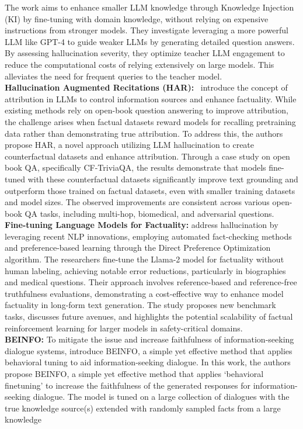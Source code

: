 \documentclass[11pt]{article}
\begin{document}
The work aims to enhance smaller LLM knowledge through Knowledge Injection (KI) by fine-tuning with domain knowledge, without relying on expensive instructions from stronger models. They investigate leveraging a more powerful LLM like GPT-4 to guide weaker LLMs by generating detailed question answers. By assessing hallucination severity, they optimize teacher LLM engagement to reduce the computational costs of relying extensively on large models. This alleviates the need for frequent queries to the teacher model. \\
\textbf{Hallucination Augmented Recitations (HAR):}~\cite{köksal2023hallucination} introduce the concept of attribution in LLMs to control information sources and enhance factuality. While existing methods rely on open-book question answering to improve attribution, the challenge arises when factual datasets reward models for recalling pretraining data rather than demonstrating true attribution. To address this, the authors propose HAR, a novel approach utilizing LLM hallucination to create counterfactual datasets and enhance attribution. Through a case study on open book QA, specifically CF-TriviaQA, the results demonstrate that models fine-tuned with these counterfactual datasets significantly improve text grounding and outperform those trained on factual datasets, even with smaller training datasets and model sizes. The observed improvements are consistent across various open-book QA tasks, including multi-hop, biomedical, and adversarial questions. \\
\textbf{Fine-tuning Language Models for Factuality:} \cite{tian2023finetuning} address hallucination by leveraging recent NLP innovations, employing automated fact-checking methods and preference-based learning through the Direct Preference Optimization algorithm. The researchers fine-tune the Llama-2 model for factuality without human labeling, achieving notable error reductions, particularly in biographies and medical questions. Their approach involves reference-based and reference-free truthfulness evaluations, demonstrating a cost-effective way to enhance model factuality in long-form text generation. The study proposes new benchmark tasks, discusses future avenues, and highlights the potential scalability of factual reinforcement learning for larger models in safety-critical domains. \\
\textbf{BEINFO:} To mitigate the issue and increase
faithfulness of information-seeking dialogue
systems, \cite{razumovskaia2023textitdial} introduce BEINFO, a simple yet effective method that applies behavioral tuning to aid information-seeking dialogue. In this work, the authors propose BEINFO, a simple yet effective method that applies ‘behavioral finetuning’ to increase the faithfulness of the generated responses for information-seeking dialogue. The model is tuned on a large collection of dialogues with the true knowledge source(s) extended with randomly sampled facts from a large knowledge
\end{document}
